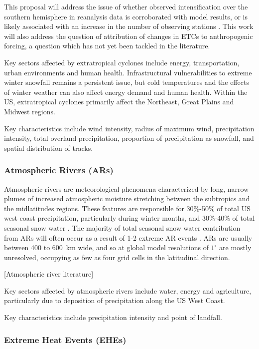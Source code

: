 \documentclass[11pt]{article}
\begin{document}
This proposal will address the issue of whether observed intensification over the southern hemisphere in reanalysis data is corroborated with model results, or is likely associated with an increase in the number of observing stations \citep{simmonds2000variability}.  This work will also address the question of attribution of changes in ETCs to anthropogenic forcing, a question which has not yet been tackled in the literature.

Key sectors affected by extratropical cyclones include energy, transportation, urban environments and human health.  Infrastructural vulnerabilities to extreme winter snowfall remains a persistent issue, but  cold temperatures and the effects of winter weather can also affect energy demand and human health.  Within the US, extratropical cyclones primarily affect the Northeast, Great Plains and Midwest regions.

Key characteristics include wind intensity, radius of maximum wind, precipitation intensity, total overland precipitation, proportion of precipitation as snowfall, and spatial distribution of tracks.

\subsubsection*{Atmospheric Rivers (ARs)}

Atmospheric rivers are meteorological phenomena characterized by long, narrow plumes of increased atmospheric moisture stretching between the subtropics and the midlatitudes regions.  These features are responsible for 30\%-50\% of total US west coast precipitation, particularly during winter months, and 30\%-40\% of total seasonal snow water \citep{dettinger2011atmospheric}.  The majority of total seasonal snow water contribution from ARs will often occur as a result of 1-2 extreme AR events \citep{guan2010extreme}.  ARs are usually between 400 to 600\ km wide, and so at global model resolutions of $1^\circ$ are mostly unresolved, occupying as few as four grid cells in the latitudinal direction.

{\color{red}[Atmospheric river literature]}

Key sectors affected by atmospheric rivers include water, energy and agriculture, particularly due to deposition of precipitation along the US West Coast.

Key characteristics include precipitation intensity and point of landfall.

\subsubsection*{Extreme Heat Events (EHEs)}
\end{document}
